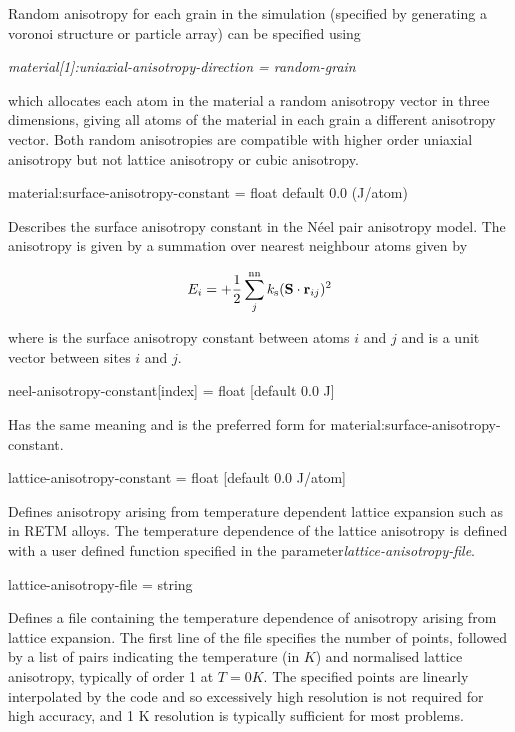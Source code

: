 Random anisotropy for each grain in the simulation (specified by generating a voronoi structure or particle array) can be specified using

\textit{material[1]:uniaxial-anisotropy-direction = random-grain}

which allocates each atom in the material a random anisotropy vector in three dimensions, giving all atoms of the material in each grain a different
anisotropy vector. Both random anisotropies are compatible with higher order uniaxial anisotropy but not lattice anisotropy or cubic anisotropy.



{\zicf material:surface-anisotropy-constant = float default 0.0 (J/atom)} Describes the surface anisotropy constant in the N\'eel pair anisotropy model. The anisotropy is given by a summation over nearest neighbour atoms given by

\begin{equation*}
E_i = +\frac{1}{2} \sum_j^{\mathrm{nn}} k_{\mathrm{s}} (\mathbf{S} \cdot \mathbf{r}_{ij} )^2
\end{equation*}

\noindent where \ksurf is the surface anisotropy constant between atoms $i$ and $j$ and \rij is a unit vector between sites $i$ and $j$.

{\zicf neel-anisotropy-constant[index] = float [default 0.0 J]}
Has the same meaning and is the preferred form for material:surface-anisotropy-constant.

{\zicf lattice-anisotropy-constant = float [default 0.0 J/atom]}
Defines anisotropy arising from temperature dependent lattice expansion such as in RETM alloys. The temperature dependence of the lattice anisotropy is defined with a user defined function specified in the parameter\textit{lattice-anisotropy-file}.

{\zicf lattice-anisotropy-file = string} Defines a file containing the temperature dependence of anisotropy arising from lattice expansion. The first line of the file specifies the number of points, followed by a list of pairs indicating the temperature (in $K$) and normalised lattice anisotropy, typically of order 1 at $T = 0 K$. The specified points are
linearly interpolated by the code and so excessively high resolution is not required for high accuracy, and 1 K resolution is typically sufficient for most problems.

